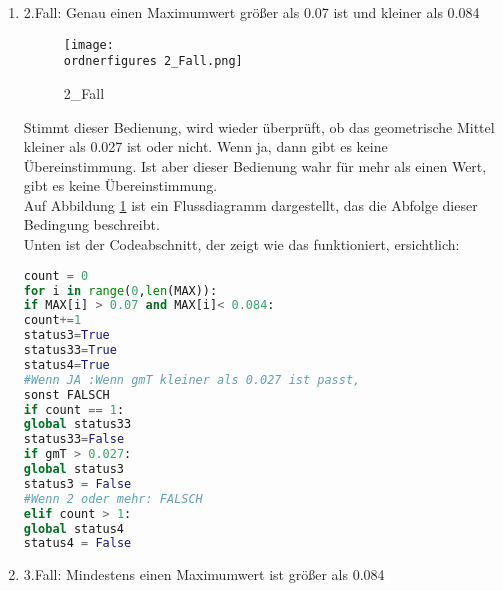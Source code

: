 \begin{enumerate}
\begin{itemize}
\begin{enumerate}
\begin{enumerate}
\begin{lstlisting}[language=Python]
global count
count = 0
for i in range(0,len(MAX)):
if MAX[i] > 0.06:
count+=1
status1=True
status11=True
status2=True
status22=True
				
#Wenn JA: Nur wenn gmT kleiner als 0.01 sind sie richtig,
sonst FALSCH
if count ==1:
global status11
status11=False
if count >= 2:
global status22
status22=False
if gmT > 0.01:
global status1
status1 = False
				
#Wenn NEIN: gmT muss kleiner als 0.027 sein,
			um RICHTIG zu sein
else:
if gmT > 0.027:
global status2
status2 = False
\end{lstlisting}
	
			
			\item 2.Fall: Genau einen Maximumwert größer als 0.07 ist und kleiner als 0.084 \\
			
				\begin{figure}[H]
				\centering
				\texttt{[image: \\ordnerfigures 2\_Fall.png]}
				\caption{2\_Fall}
				\label{fig:2_Fall}
			\end{figure}
			
			Stimmt dieser Bedienung, wird wieder überprüft, ob das geometrische Mittel kleiner als 0.027 ist oder nicht. Wenn ja, dann gibt es keine Übereinstimmung. Ist aber dieser Bedienung wahr für mehr als einen Wert, gibt es keine Übereinstimmung. \\
			
			Auf Abbildung \ref{fig:2_Fall} ist ein Flussdiagramm dargestellt, das die Abfolge dieser Bedingung beschreibt.\\
			
			Unten ist der Codeabschnitt, der zeigt wie das funktioniert, ersichtlich:\\
			
\begin{lstlisting}[language=Python]
count = 0
for i in range(0,len(MAX)):
if MAX[i] > 0.07 and MAX[i]< 0.084:
count+=1
status3=True
status33=True
status4=True
#Wenn JA :Wenn gmT kleiner als 0.027 ist passt, 
sonst FALSCH
if count == 1:
global status33
status33=False
if gmT > 0.027:
global status3
status3 = False
#Wenn 2 oder mehr: FALSCH
elif count > 1:
global status4
status4 = False
\end{lstlisting}
			
			\item 3.Fall: Mindestens einen Maximumwert ist größer als 0.084 \\
			

\end{enumerate}
\end{enumerate}
\end{itemize}
\end{enumerate}
